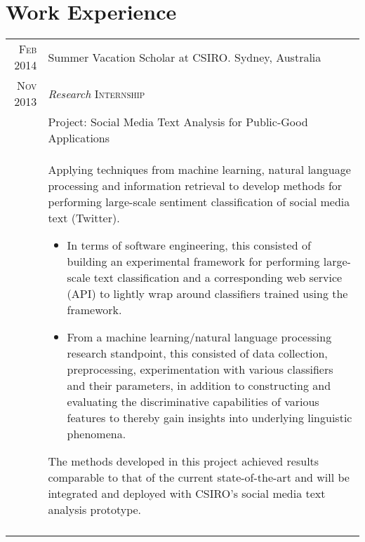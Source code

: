 \documentclass[a4paper,10pt]{article} %
\begin{document}

\section{Work Experience}

\begin{tabular}{r|p{12.2cm}}

\textsc{Feb 2014}	 & Summer Vacation Scholar at CSIRO. Sydney, Australia \\
\textsc{Nov 2013} & \emph{Research} \hfill \textsc{Internship} \\
& \normalsize{ Project: Social Media Text Analysis for Public-Good Applications}\\
& \footnotesize{
Applying techniques from machine learning, natural language processing and information retrieval to develop methods for performing large-scale sentiment classification of social media text (Twitter).
\begin{itemize}
\item In terms of software engineering, this consisted of building an experimental framework for performing large-scale text classification and a corresponding web service (API) to lightly wrap around classifiers trained using the framework. 
\item From a machine learning/natural language processing research standpoint, this consisted of data collection, preprocessing, experimentation with various classifiers and their parameters, in addition to constructing and evaluating the discriminative capabilities of various features to thereby gain insights into underlying linguistic phenomena.
\end{itemize}
The methods developed in this project achieved results comparable to that of the current state-of-the-art and will be integrated and deployed with CSIRO's social media text analysis prototype.
}\\
				
\multicolumn{2}{c}{}\\


\end{tabular}
\end{document}
